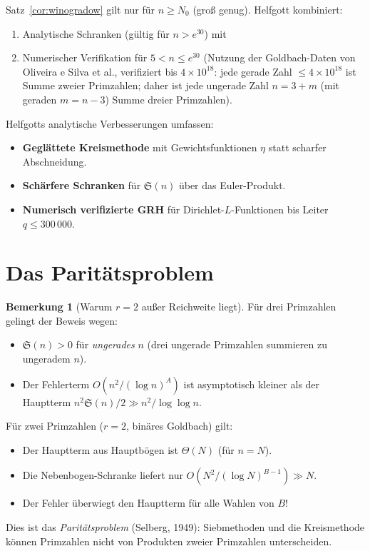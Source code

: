 \documentclass[12pt,a4paper]{amsart}
\theoremstyle{definition}
\newtheorem{bemerkung}[theorem]{Bemerkung}
\begin{document}
Satz~\ref{cor:winogradow} gilt nur für $n \geq N_0$ (groß genug).
Helfgott kombiniert:
\begin{enumerate}
  \item Analytische Schranken (gültig für $n > e^{30}$) mit
  \item Numerischer Verifikation für $5 < n \leq e^{30}$
    (Nutzung der Goldbach-Daten von Oliveira e Silva et al., verifiziert
    bis $4 \times 10^{18}$: jede gerade Zahl $\leq 4 \times 10^{18}$
    ist Summe zweier Primzahlen; daher ist jede ungerade Zahl
    $n = 3 + m$ (mit geraden $m = n-3$) Summe dreier Primzahlen).
\end{enumerate}

Helfgotts analytische Verbesserungen umfassen:
\begin{itemize}
  \item \textbf{Geglättete Kreismethode} mit Gewichtsfunktionen $\eta$
    statt scharfer Abschneidung.
  \item \textbf{Schärfere Schranken} für $\mathfrak{S}(n)$ über das
    Euler-Produkt.
  \item \textbf{Numerisch verifizierte GRH} für Dirichlet-$L$-Funktionen
    bis Leiter $q \leq 300\,000$.
\end{itemize}

\section{Das Paritätsproblem}
\label{sec:paritaet}

\begin{bemerkung}[Warum $r = 2$ außer Reichweite liegt]
  Für drei Primzahlen gelingt der Beweis wegen:
  \begin{itemize}
    \item $\mathfrak{S}(n) > 0$ für \emph{ungerades} $n$
      (drei ungerade Primzahlen summieren zu ungeradem $n$).
    \item Der Fehlerterm $O(n^2/(\log n)^A)$ ist asymptotisch kleiner
      als der Hauptterm $n^2 \mathfrak{S}(n)/2 \gg n^2/\log\log n$.
  \end{itemize}
  Für zwei Primzahlen ($r = 2$, binäres Goldbach) gilt:
  \begin{itemize}
    \item Der Hauptterm aus Hauptbögen ist $\Theta(N)$ (für $n = N$).
    \item Die Nebenbogen-Schranke liefert nur $O(N^2/(\log N)^{B-1}) \gg N$.
    \item Der Fehler überwiegt den Hauptterm für alle Wahlen von $B$!
  \end{itemize}
  Dies ist das \emph{Paritätsproblem} (Selberg, 1949): Siebmethoden
  und die Kreismethode können Primzahlen nicht von Produkten zweier
  Primzahlen unterscheiden.
\end{bemerkung}
\end{document}
